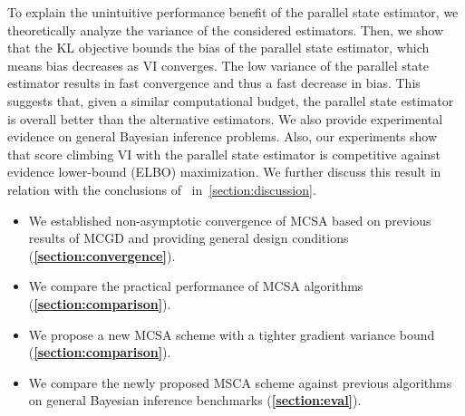 To explain the unintuitive performance benefit of the parallel state estimator, we theoretically analyze the variance of the considered estimators.
Then, we show that the KL objective bounds the bias of the parallel state estimator, which means bias decreases as VI converges.
The low variance of the parallel state estimator results in fast convergence and thus a fast decrease in bias.
This suggests that, given a similar computational budget, the parallel state estimator is overall better than the alternative estimators.
We also provide experimental evidence on general Bayesian inference problems.
Also, our experiments show that score climbing VI with the parallel state estimator is competitive against evidence lower-bound (ELBO) maximization.
We further discuss this result in relation with the conclusions of~\citet{dhaka_challenges_2021} in~\cref{section:discussion}.



\begin{itemize}[noitemsep]
\item[\ding{228}] We established non-asymptotic convergence of MCSA based on previous results of MCGD and providing general design conditions (\textbf{\cref{section:convergence}}).
\item[\ding{228}] We compare the practical performance of MCSA algorithms (\textbf{\cref{section:comparison}}).
\item[\ding{228}] We propose a new MCSA scheme with a tighter gradient variance bound (\textbf{\cref{section:comparison}}).
\item[\ding{228}] We compare the newly proposed MSCA scheme against previous algorithms on general Bayesian inference benchmarks (\textbf{\cref{section:eval}}).
\end{itemize}
\vspace{-0.05in}

